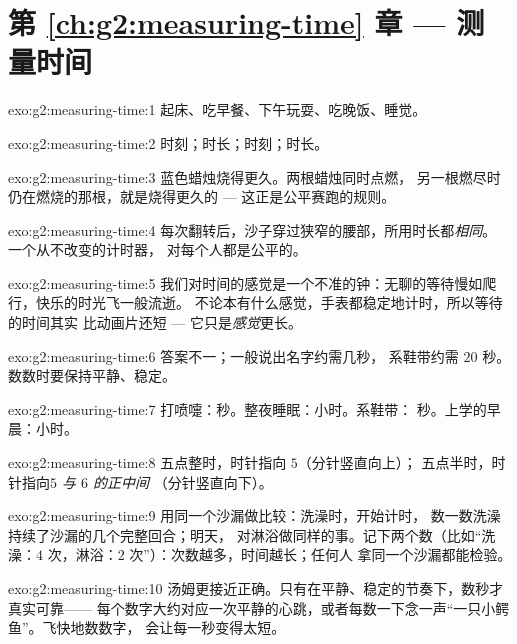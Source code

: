 \section*{第 \ref{ch:g2:measuring-time} 章 --- 测量时间}

\begin{solution}{exo:g2:measuring-time:1}
起床、吃早餐、下午玩耍、吃晚饭、睡觉。
\end{solution}

\begin{solution}{exo:g2:measuring-time:2}
时刻；时长；时刻；时长。
\end{solution}

\begin{solution}{exo:g2:measuring-time:3}
蓝色蜡烛烧得更久。两根蜡烛同时点燃，
另一根燃尽时仍在燃烧的那根，就是烧得更久的 ---
这正是公平赛跑的规则。
\end{solution}

\begin{solution}{exo:g2:measuring-time:4}
每次翻转后，沙子穿过狭窄的腰部，所用时长都\emph{相同}。
一个从不改变的计时器，
对每个人都是公平的。
\end{solution}

\begin{solution}{exo:g2:measuring-time:5}
我们对时间的感觉是一个不准的钟：无聊的等待慢如爬行，快乐的时光飞一般流逝。
不论本有什么感觉，手表都稳定地计时，所以等待的时间其实
比动画片还短 --- 它只是\emph{感觉}更长。
\end{solution}

\begin{solution}{exo:g2:measuring-time:6}
答案不一；一般说出名字约需几秒，
系鞋带约需 $20$ 秒。数数时要保持平静、稳定。
\end{solution}

\begin{solution}{exo:g2:measuring-time:7}
打喷嚏：秒。整夜睡眠：小时。系鞋带：
秒。上学的早晨：小时。
\end{solution}

\begin{solution}{exo:g2:measuring-time:8}
五点整时，时针指向 $5$（分针竖直向上）；
五点半时，时针指向\emph{$5$ 与 $6$ 的正中间}
（分针竖直向下）。
\end{solution}

\begin{solution}{exo:g2:measuring-time:9}
用同一个沙漏做比较：洗澡时，开始计时，
数一数洗澡持续了沙漏的几个完整回合；明天，
对淋浴做同样的事。记下两个数（比如“洗澡：$4$
次，淋浴：$2$ 次”）：次数越多，时间越长；任何人
拿同一个沙漏都能检验。
\end{solution}

\begin{solution}{exo:g2:measuring-time:10}
汤姆更接近正确。只有在平静、稳定的节奏下，数秒才真实可靠——
每个数字大约对应一次平静的心跳，或者每数一下念一声“一只小鳄
鱼”。飞快地数数字，
会让每一秒变得太短。
\end{solution}
